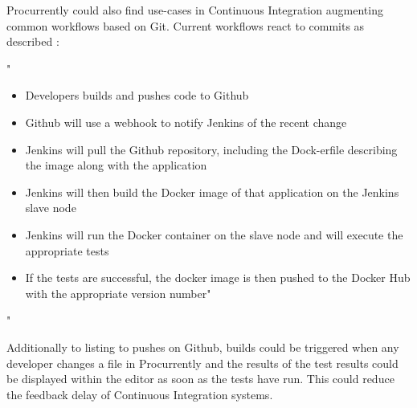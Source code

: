 Procurrently could also find use-cases in Continuous Integration augmenting common workflows based on Git. 
Current workflows react to commits as described :

"
\begin{itemize}
    \item Developers builds and pushes code to Github
    \item Github will use a webhook to notify Jenkins of the recent change
    \item Jenkins will pull the Github repository, including the Dock-erfile describing the image along with the application
    \item Jenkins will then build the Docker image of that application on the Jenkins slave node
    \item Jenkins will run the Docker container on the slave node and will execute the appropriate tests
    \item If the tests are successful, the docker image is then pushed to the Docker Hub with the appropriate version number"
\end{itemize}
"\cite{8695332}

Additionally to listing to pushes on Github, builds could be triggered when any developer changes a file in Procurrently and the results of the test results could be displayed within the editor as soon as the tests have run. This could reduce the feedback delay of Continuous Integration systems.